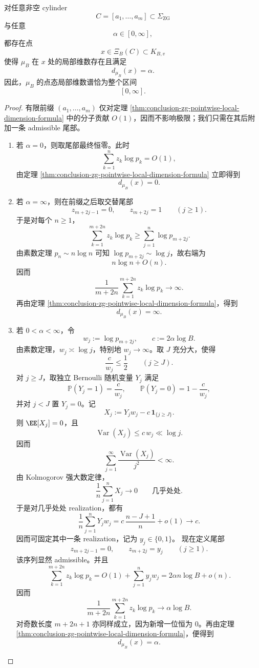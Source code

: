 \begin{theorem}\label{thm:conclusion-zg-full-local-dimension-spectrum-every-cylinder}
对任意非空 cylinder
\[
C=[a_1,\dots,a_m]\subset \Sigma_{\mathrm{ZG}}
\]
与任意
\[
\alpha\in[0,\infty],
\]
都存在点
\[
x\in \Xi_B(C)\subset K_{B,v}
\]
使得 \(\mu_B\) 在 \(x\) 处的局部维数存在且满足
\[
d_{\mu_B}(x)=\alpha.
\]
因此，\(\mu_B\) 的点态局部维数谱恰为整个区间
\[
[0,\infty].
\]
\end{theorem}
\begin{proof}
有限前缀 \((a_1,\dots,a_m)\) 仅对定理
\ref{thm:conclusion-zg-pointwise-local-dimension-formula} 中的分子贡献 \(O(1)\)，因而不影响极限；我们只需在其后附加一条 admissible 尾部。

\begin{enumerate}
  \item 若 \(\alpha=0\)，则取尾部最终恒零。此时
  \[
  \sum_{k=1}^{n}z_k\log p_k=O(1),
  \]
  由定理 \ref{thm:conclusion-zg-pointwise-local-dimension-formula} 立即得到
  \[
  d_{\mu_B}(x)=0.
  \]

  \item 若 \(\alpha=\infty\)，则在前缀之后取交替尾部
  \[
  z_{m+2j-1}=0,
  \qquad
  z_{m+2j}=1
  \qquad (j\ge 1).
  \]
  于是对每个 \(n\ge 1\)，
  \[
  \sum_{k=1}^{m+2n}z_k\log p_k
  \ge
  \sum_{j=1}^{n}\log p_{m+2j}.
  \]
  由素数定理 \(p_n\sim n\log n\) 可知 \(\log p_{m+2j}\sim \log j\)，故右端为
  \[
  n\log n+O(n).
  \]
  因而
  \[
  \frac{1}{m+2n}\sum_{k=1}^{m+2n}z_k\log p_k\longrightarrow \infty.
  \]
  再由定理 \ref{thm:conclusion-zg-pointwise-local-dimension-formula}，得到
  \[
  d_{\mu_B}(x)=\infty.
  \]

  \item 若 \(0<\alpha<\infty\)，令
  \[
  w_j:=\log p_{m+2j},
  \qquad
  c:=2\alpha\log B.
  \]
  由素数定理，\(w_j\asymp \log j\)，特别地 \(w_j\to\infty\)。取 \(J\) 充分大，使得
  \[
  \frac{c}{w_j}\le \frac12
  \qquad (j\ge J).
  \]
  对 \(j\ge J\)，取独立 Bernoulli 随机变量 \(Y_j\) 满足
  \[
  \mathbb P(Y_j=1)=\frac{c}{w_j},
  \qquad
  \mathbb P(Y_j=0)=1-\frac{c}{w_j},
  \]
  并对 \(j<J\) 置 \(Y_j=0\)。记
  \[
  X_j:=Y_j w_j-c\,\mathbf 1_{\{j\ge J\}}.
  \]
  则 \(\EE[X_j]=0\)，且
  \[
  \operatorname{Var}(X_j)\le c\,w_j\ll \log j.
  \]
  因而
  \[
  \sum_{j=1}^{\infty}\frac{\operatorname{Var}(X_j)}{j^2}<\infty.
  \]
  由 Kolmogorov 强大数定律，
  \[
  \frac{1}{n}\sum_{j=1}^{n}X_j\longrightarrow 0
  \qquad \text{几乎处处}.
  \]
  于是对几乎处处 realization，都有
  \[
  \frac{1}{n}\sum_{j=1}^{n}Y_j w_j
  =
  c\,\frac{n-J+1}{n}+o(1)
  \longrightarrow c.
  \]
  因而可固定其中一条 realization，记为 \(y_j\in\{0,1\}\)。
  现在定义尾部
  \[
  z_{m+2j-1}=0,
  \qquad
  z_{m+2j}=y_j
  \qquad (j\ge 1).
  \]
  该序列显然 admissible。并且
  \[
  \sum_{k=1}^{m+2n}z_k\log p_k
  =
  O(1)+\sum_{j=1}^{n}y_j w_j
  =
  2\alpha n\log B+o(n).
  \]
  因而
  \[
  \frac{1}{m+2n}\sum_{k=1}^{m+2n}z_k\log p_k
  \longrightarrow
  \alpha\log B.
  \]
  对奇数长度 \(m+2n+1\) 亦同样成立，因为新增一位恒为 \(0\)。再由定理 \ref{thm:conclusion-zg-pointwise-local-dimension-formula}，便得到
  \[
  d_{\mu_B}(x)=\alpha.
  \]
\end{enumerate}


\end{proof}
